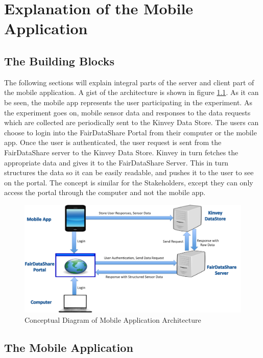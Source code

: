 \chapter{Explanation of the Mobile Application}

\section{The Building Blocks}



The following sections will explain integral parts of the server and client part of the mobile application. A gist of the architecture is shown
in figure \ref{fig:bb}. As it can be seen, the mobile app represents the user participating in the experiment. As the experiment goes on,
mobile sensor data and responses to the data requests which are collected are periodically sent to the Kinvey Data Store. 
The users can choose to login into the FairDataShare Portal from their computer or the mobile app. Once the user is authenticated, the user request
is sent from the FairDataShare server to the Kinvey Data Store. Kinvey in turn fetches the appropriate data and gives it to the FairDataShare Server. This in turn structures the data so it can be easily readable, and pushes it to the user to see on the portal. The concept is similar for the Stakeholders, except they can only access the portal through the computer and not the mobile app.

\begin{figure}[ht!]
\centering
\includegraphics[width=\textwidth,keepaspectratio]{./images/blocks_app}
\caption{Conceptual Diagram of Mobile Application Architecture}
\label{fig:bb}
\end{figure}


\section{The Mobile Application}





